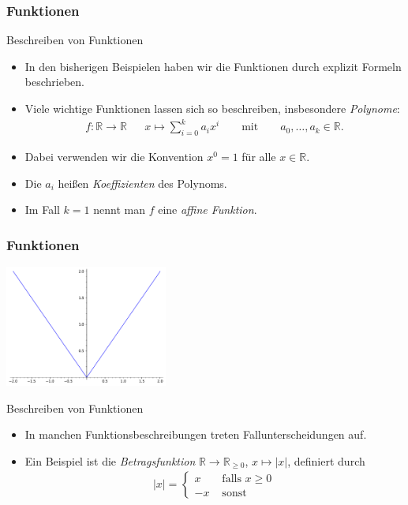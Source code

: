 \documentclass{beamer}
\renewcommand{\emph}[1]{{\textcolor{solarizedRed}{\itshape #1}}}
\newcommand\RR{\mathbb R}
\newcommand\RRpos{\mathbb R_{\geq0}}
\newcommand{\ue}{\"u}
\newcommand{\mytitle}{Funktionen}
\begin{document}
\begin{frame}\frametitle{\mytitle}
	\begin{block}{Beschreiben von Funktionen}
		\begin{itemize}
			\item In den bisherigen Beispielen haben wir die Funktionen durch explizit Formeln beschrieben.
			\item Viele wichtige Funktionen lassen sich so beschreiben, insbesondere \emph{Polynome}:
				\begin{align*}
					f:\RR\to\RR&&x\mapsto\sum_{i=0}^ka_ix^i\qquad\mbox{mit}\qquad a_0,\ldots,a_k\in\RR.
				\end{align*}
			\item Dabei verwenden wir die Konvention $x^0=1$ f\ue r alle $x\in\RR$.
			\item Die $a_i$ hei\ss en \emph{Koeffizienten} des Polynoms.
			\item Im Fall $k=1$ nennt man $f$ eine \emph{affine Funktion}.
		\end{itemize}
	\end{block}
\end{frame}

\begin{frame}\frametitle{\mytitle}
	\hfill\includegraphics[height=40mm]{pics/graph_abs.pdf}
	\begin{block}{Beschreiben von Funktionen}
		\begin{itemize}
			\item In manchen Funktionsbeschreibungen treten Fallunterscheidungen auf.
			\item Ein Beispiel ist die \emph{Betragsfunktion} $\RR\to\RRpos$, $x\mapsto|x|$, definiert durch
				\begin{align*}
					|x|=\begin{cases}x&\mbox{ falls }x\geq0\\-x&\mbox{ sonst}\end{cases}
				\end{align*}
		\end{itemize}
	\end{block}
\end{frame}
\end{document}
